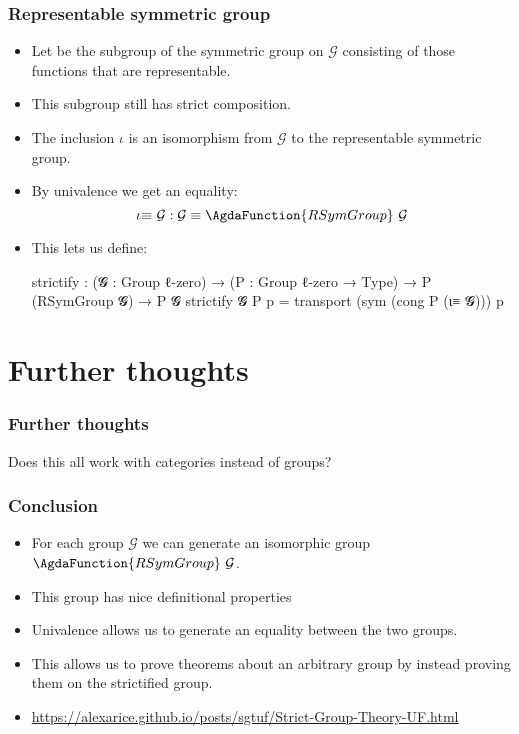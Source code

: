 \documentclass[aspectratio=169,presentation]{beamer}
\begin{document}
\begin{frame}
  \frametitle{Representable symmetric group}

  \begin{itemize}
  \item<+-> Let \AgdaSpace{} be the subgroup of the symmetric group on \(\mathcal{G}\) consisting of those functions that are representable.

  \item<+-> This subgroup still has strict composition.
  \item<+-> The inclusion \(ι\) is an isomorphism from \(\mathcal{G}\) to the representable symmetric group.
  \item<+-> By univalence we get an equality:
    \[ \iota\mathord\equiv~\mathcal{G}: \mathcal{G} \equiv \AgdaFunction{RSymGroup}~\mathcal{G} \]
  \item<+-> This lets us define:
    \begin{code}
      strictify :  (𝓖 : Group ℓ-zero)
                →  (P : Group ℓ-zero → Type)
                →  P (RSymGroup 𝓖)
                →  P 𝓖
      strictify 𝓖 P p = transport (sym (cong P (ι≡ 𝓖))) p
    \end{code}
  \end{itemize}
\end{frame}

\section{Further thoughts}
\begin{frame}
  \frametitle{Further thoughts}
  \pause{}
  \begin{center}
    Does this all work with categories instead of groups?
  \end{center}
\end{frame}
\begin{frame}
  \frametitle{Conclusion}
  \begin{itemize}
  \item For each group \(\mathcal{G}\) we can generate an isomorphic group \(\AgdaFunction{RSymGroup}~\mathcal{G}\).
  \item This group has nice definitional properties
  \item Univalence allows us to generate an equality between the two groups.
  \item This allows us to prove theorems about an arbitrary group by instead proving them on the strictified group.
  \item \small\url{https://alexarice.github.io/posts/sgtuf/Strict-Group-Theory-UF.html}
  \end{itemize}

\end{frame}
\end{document}

